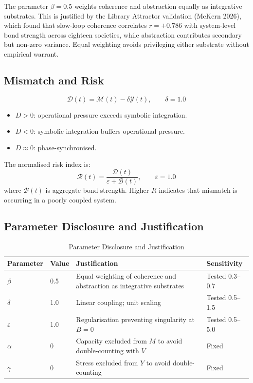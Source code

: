 \documentclass[11pt,a4paper]{article}
\begin{document}
The parameter \(\beta=0.5\) weights coherence and abstraction equally as integrative substrates. This is justified by the Library Attractor validation (McKern 2026), which found that slow-loop coherence correlates \(r=+0.786\) with system-level bond strength across eighteen societies, while abstraction contributes secondary but non-zero variance. Equal weighting avoids privileging either substrate without empirical warrant.

\subsection{Mismatch and Risk}
\begin{equation}
\mathcal{D}(t) = \mathcal{M}(t) - \delta\mathcal{Y}(t), \qquad \delta = 1.0
\end{equation}

\begin{itemize}
\item \(D>0\): operational pressure exceeds symbolic integration.
\item \(D<0\): symbolic integration buffers operational pressure.
\item \(D\approx0\): phase-synchronised.
\end{itemize}

The normalised risk index is:
\begin{equation}
\mathcal{R}(t) = \frac{\mathcal{D}(t)}{\varepsilon + \mathcal{B}(t)}, \qquad \varepsilon = 1.0
\end{equation}
where \(\mathcal{B}(t)\) is aggregate bond strength. Higher \(R\) indicates that mismatch is occurring in a poorly coupled system.

\subsection{Parameter Disclosure and Justification}
\begin{table}[htbp]
\centering
\caption{Parameter Disclosure and Justification}
\begin{tabular}{llll}
\toprule
Parameter & Value & Justification & Sensitivity \\
\midrule
\(\beta\) & 0.5 & Equal weighting of coherence and abstraction as integrative substrates & Tested 0.3--0.7 \\
\(\delta\) & 1.0 & Linear coupling; unit scaling & Tested 0.5--1.5 \\
\(\varepsilon\) & 1.0 & Regularisation preventing singularity at \(B=0\) & Tested 0.5--5.0 \\
\(\alpha\) & 0 & Capacity excluded from \(M\) to avoid double-counting with \(V\) & Fixed \\
\(\gamma\) & 0 & Stress excluded from \(Y\) to avoid double-counting & Fixed \\
\bottomrule
\end{tabular}
\end{table}
\end{document}
